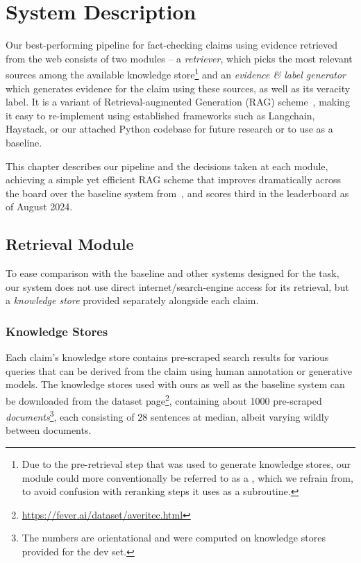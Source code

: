 
\section{System Description}
\label{sec:system}
Our best-performing pipeline for fact-checking claims using evidence retrieved from the web consists of two modules -- a \textit{retriever}, which picks the most relevant sources among the available knowledge store\footnote{Due to the pre-retrieval step that was used to generate knowledge stores, our  module could more conventionally be referred to as a , which we refrain from, to avoid confusion with reranking steps it uses as a subroutine.} and an \textit{evidence \& label generator} which generates evidence for the claim using these sources, as well as its veracity label. 
It is a variant of Retrieval-augmented Generation (RAG) scheme~\cite{rag}, making it easy to re-implement using established frameworks such as Langchain, Haystack, or our attached Python codebase for future research or to use as a baseline.

This chapter describes our pipeline and the decisions taken at each module, achieving a simple yet efficient RAG scheme that improves dramatically across the board over the baseline system from~\cite{averitec2024}, and scores third in the \averitec{}  leaderboard as of August 2024.

\subsection{Retrieval Module}
To ease comparison with the baseline and other systems designed for the task, our system does not use direct internet/search-engine access for its retrieval, but a \textit{knowledge store} provided separately alongside each claim.


\subsubsection{Knowledge Stores}
Each claim's knowledge store contains pre-scraped search results for various queries that can be derived from the claim using human annotation or generative models.
The knowledge stores used with ours as well as the baseline system can be downloaded from the \averitec{}  dataset page\footnote{\url{https://fever.ai/dataset/averitec.html}}, containing about 1000 pre-scraped \textit{documents}\footnote{\label{devsetnote} The numbers are orientational and were computed on knowledge stores provided for the \averitec{}  dev set.}, each consisting of $28$ sentences at median, albeit varying wildly between documents.

